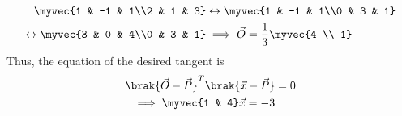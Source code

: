 \begin{enumerate}[label=\arabic*.,ref=\thesubsection.\theenumi]
\begin{align}
\myvec{1 & -1 & 1\\2 & 1 & 3}&\leftrightarrow\myvec{1 & -1 & 1\\0 & 3 & 1}
\nonumber \\
\leftrightarrow\myvec{3 & 0 & 4\\0 & 3 & 1}&\implies \vec{O} = \frac{1}{3}\myvec{4 \\ 1}
\end{align} 
%
Thus, the equation of the desired tangent is 
\begin{align} 
\brak{\vec{O}-\vec{P}}^T\brak{\vec{x}-\vec{P}} &= 0
\nonumber \\
\implies
\myvec{1 & 4}\vec{x}=-3
\end{align} 


\end{enumerate}
